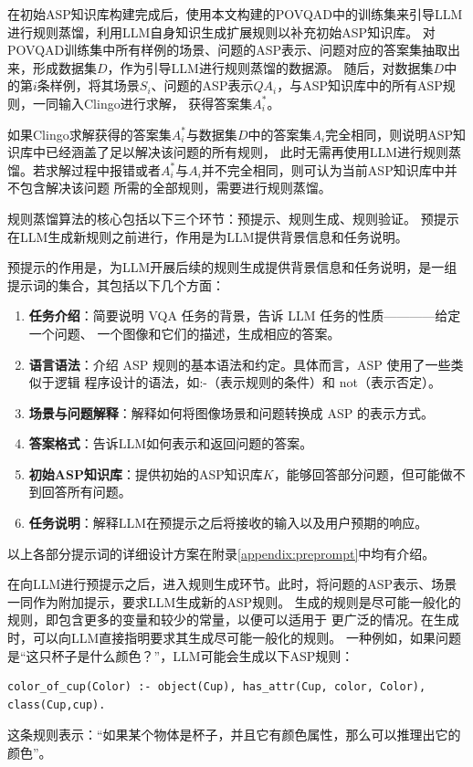 在初始ASP知识库构建完成后，使用本文构建的POVQAD中的训练集来引导LLM进行规则蒸馏，利用LLM自身知识生成扩展规则以补充初始ASP知识库。
对POVQAD训练集中所有样例的场景、问题的ASP表示、问题对应的答案集抽取出来，形成数据集$D$，作为引导LLM进行规则蒸馏的数据源。
随后，对数据集$D$中的第$i$条样例，将其场景$S_i$、问题的ASP表示$QA_i$，与ASP知识库中的所有ASP规则，一同输入Clingo进行求解，
获得答案集$A^*_i$。

如果Clingo求解获得的答案集$A^*_i$与数据集$D$中的答案集$A_i$完全相同，则说明ASP知识库中已经涵盖了足以解决该问题的所有规则，
此时无需再使用LLM进行规则蒸馏。若求解过程中报错或者$A^*_i$与$A_i$并不完全相同，则可认为当前ASP知识库中并不包含解决该问题
所需的全部规则，需要进行规则蒸馏。

规则蒸馏算法的核心包括以下三个环节：预提示、规则生成、规则验证。
预提示在LLM生成新规则之前进行，作用是为LLM提供背景信息和任务说明。

预提示的作用是，为LLM开展后续的规则生成提供背景信息和任务说明，是一组提示词的集合，其包括以下几个方面：
\begin{enumerate}[nosep]
\item \textbf{任务介绍}：简要说明 VQA 任务的背景，告诉 LLM 任务的性质————给定一个问题、
一个图像和它们的描述，生成相应的答案。
\item \textbf{语言语法}：介绍 ASP 规则的基本语法和约定。具体而言，ASP 使用了一些类似于逻辑
程序设计的语法，如:-（表示规则的条件）和 not（表示否定）。
\item \textbf{场景与问题解释}：解释如何将图像场景和问题转换成 ASP 的表示方式。
\item \textbf{答案格式}：告诉LLM如何表示和返回问题的答案。
\item \textbf{初始ASP知识库}：提供初始的ASP知识库$K$，能够回答部分问题，但可能做不到回答所有问题。
\item \textbf{任务说明}：解释LLM在预提示之后将接收的输入以及用户预期的响应。
\end{enumerate}
以上各部分提示词的详细设计方案在附录\ref{appendix:preprompt}中均有介绍。

在向LLM进行预提示之后，进入规则生成环节。此时，将问题的ASP表示、场景一同作为附加提示，要求LLM生成新的ASP规则。
生成的规则是尽可能一般化的规则，即包含更多的变量和较少的常量，以便可以适用于
更广泛的情况。在生成时，可以向LLM直接指明要求其生成尽可能一般化的规则。
一种例如，如果问题是“这只杯子是什么颜色？”，LLM可能会生成以下ASP规则：
\begin{lstlisting}
color_of_cup(Color) :- object(Cup), has_attr(Cup, color, Color), class(Cup,cup).
\end{lstlisting}
这条规则表示：“如果某个物体是杯子，并且它有颜色属性，那么可以推理出它的颜色”。


